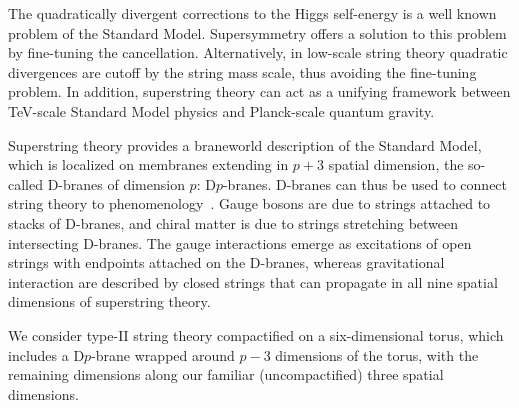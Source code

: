 %
%
%
%
%
%
The quadratically divergent corrections to the Higgs self-energy is a
well known problem of the Standard Model.
Supersymmetry offers a solution to this problem by fine-tuning the
cancellation. 
Alternatively, in low-scale string theory quadratic divergences are 
cutoff by the string mass scale, thus avoiding the fine-tuning problem.
In addition, superstring theory can act as a unifying framework between
TeV-scale Standard Model physics and Planck-scale quantum gravity.  

Superstring theory provides a braneworld description of the Standard
Model, which is localized on membranes extending in $p+3$ spatial
dimension, the so-called D-branes of dimension $p$: D$p$-branes.
D-branes can thus be used to connect string theory to
phenomenology~\cite{Antoniadis:2000ena,Cremades:2002qm,Antoniadis:2002qm}.
Gauge bosons are due to strings attached to stacks of D-branes, and
chiral matter is due to strings stretching between intersecting D-branes.
The gauge interactions emerge as excitations of open strings with endpoints
attached on the D-branes, whereas gravitational interaction are described
by closed strings that can propagate in all nine spatial dimensions of
superstring theory.

We consider type-II string theory compactified on a six-dimensional
torus, which includes a D$p$-brane wrapped around $p-3$ dimensions of the
torus, with the remaining dimensions along our familiar (uncompactified)
three spatial dimensions.

